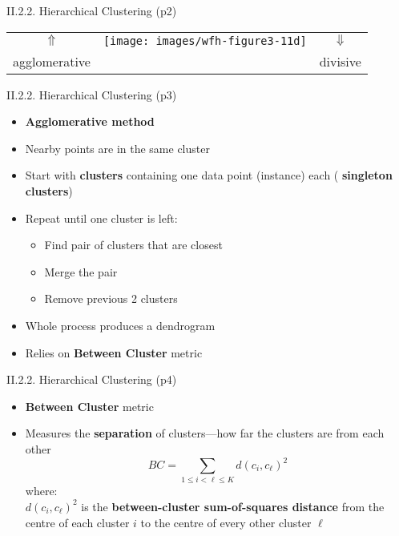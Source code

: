 \documentclass[handout]{beamer}
\newcommand{\strong}[1]{\textbf{\color{teal} #1}}
\newcommand{\stronger}[1]{\textbf{\color{purple} #1}}
\begin{document}
\begin{frame}{II.2.2. Hierarchical Clustering (p2)}
\begin{center}
\begin{tabular}{ccc}
$\Uparrow$ &
\texttt{[image: images/wfh-figure3-11d]} &
$\Downarrow$ \\
agglomerative &
\cite[Figure 3.11d]{WFH3:2011} &
divisive \\
\end{tabular}
\end{center}
\end{frame}
\begin{frame}{II.2.2. Hierarchical Clustering (p3)}
\begin{itemize}
\item[] \stronger{Agglomerative method}
\item Nearby points are in the same cluster
\item[1.] Start with \strong{clusters} containing one data point (instance) each (\strong{singleton clusters})
\item[2.] Repeat until one cluster is left:
	\begin{itemize}
	\item Find pair of clusters that are closest
	\item Merge the pair
	\item Remove previous 2 clusters
	\end{itemize}
\item Whole process produces a dendrogram
\item Relies on \stronger{Between Cluster} metric
\end{itemize}
\end{frame}
\begin{frame}{II.2.2. Hierarchical Clustering (p4)}
\begin{itemize}
\item[] \stronger{Between Cluster} metric
\item Measures the \strong{separation} of clusters---how far the clusters are from each other
\[
BC = \sum_{1 \le i < \ell \le K}{ d(c_i,c_\ell)^2 }
\]
where:\\
$d(c_i,c_\ell)^2$ is the \stronger{between-cluster sum-of-squares distance} from the centre of each cluster $i$ to the centre of every other cluster $\ell$
\end{itemize}
\end{frame}
\end{document}
